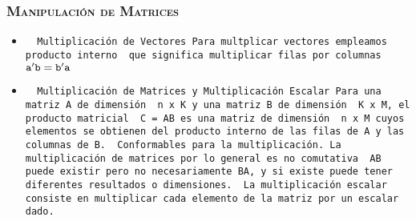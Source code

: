 \documentclass[16.5pt]{beamer}
\begin{document}
{
\begin{frame}
\frametitle{\textsc{\textbf{Manipulación de Matrices}}}
\hspace*{-5mm}
\vspace*{-5mm} 
\vspace{0.3cm}

\begin{itemize}

\item \texttt{ {\color{blue} Multiplicación de Vectores} Para multplicar vectores empleamos {\color{black} producto interno } que significa multiplicar filas por columnas} $ \color{black} \mathtt{a'b = b'a}$
\item \texttt{ {\color{blue} Multiplicación de Matrices y Multiplicación Escalar} Para una matriz A de dimensión  {\color{blue} n x K} y una matriz B de dimensión  {\color{blue} K x M}, el producto matricial  {\color{blue} C = AB} es una matriz de dimensión   {\color{blue} n x M} cuyos elementos se obtienen del producto interno de las filas de A y las columnas de B.  {\color{blue} Conformables para la multiplicación}. La multiplicación de matrices por lo general es no comutativa  {\color{blue} AB puede existir pero no necesariamente BA, y si existe puede tener diferentes resultados o dimensiones}.  {\color{red} La multiplicación escalar} consiste en multiplicar cada elemento de la matriz por un escalar dado.}
\end{itemize}

\end{frame}
}

{
}
\end{document}
